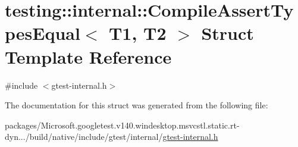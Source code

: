 \hypertarget{structtesting_1_1internal_1_1_compile_assert_types_equal}{}\section{testing\+::internal\+::Compile\+Assert\+Types\+Equal$<$ T1, T2 $>$ Struct Template Reference}
\label{structtesting_1_1internal_1_1_compile_assert_types_equal}


{\ttfamily \#include $<$gtest-\/internal.\+h$>$}



The documentation for this struct was generated from the following file\+:\begin{DoxyCompactItemize}
\item 
packages/\+Microsoft.\+googletest.\+v140.\+windesktop.\+msvcstl.\+static.\+rt-\/dyn.../build/native/include/gtest/internal/\mbox{\hyperlink{gtest-internal_8h}{gtest-\/internal.\+h}}\end{DoxyCompactItemize}
